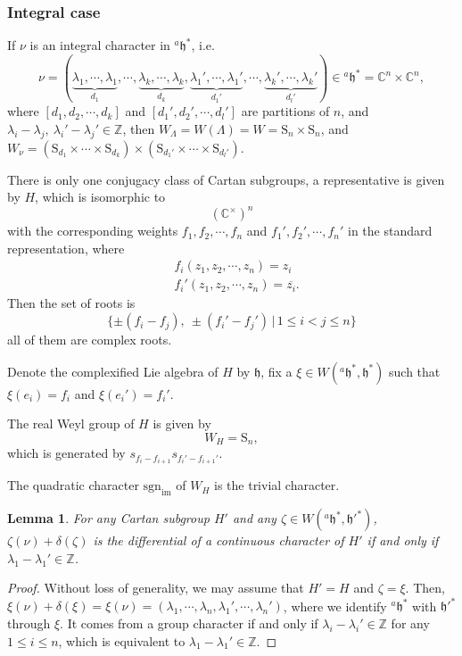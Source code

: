 \documentclass[12pt, a4paper]{amsart}
\numberwithin{equation}{section}
\newtheorem{lem}[thm]{Lemma}
\newcommand{\BC}{{\mathbb {C}}}
\newcommand{\BZ}{{\mathbb {Z}}}
\newcommand{\fh}{\mathfrak{h}}
\newcommand{\sgn}{{\mathrm{sgn}}}
\newcommand{\set}[2]{\{#1\,|\,#2\}}
\renewcommand{\bar}{\overline}
\begin{document}
\subsubsection{Integral case}
If $\nu$ is an integral character in $^{a}\fh^*$, i.e. 
$$\nu =  (\underbrace{\lambda_1, \cdots, \lambda_1}_{d_1}, \cdots, \underbrace{\lambda_k, \cdots, \lambda_k}_{d_k}, \underbrace{\lambda_1', \cdots, \lambda_1'}_{d_1'}, \cdots, \underbrace{\lambda_k', \cdots, \lambda_k'}_{d_{l}'} ) \in {^{a}\fh^*} = \BC^n \times \BC^n,$$ 
where $[d_1,d_2,\cdots,d_k]$ and $[d_1',d_2',\cdots,d_l']$ are partitions of $n$, and $\lambda_i - \lambda_j, \ \lambda_i' - \lambda_j' \in \BZ$, then $W_{\Lambda} =W(\Lambda) = W = \mathrm{S}_n \times \mathrm{S}_n$, and $W_\nu = (\mathrm{S}_{d_1} \times \cdots \times \mathrm{S}_{d_k}) \times (\mathrm{S}_{d_1'} \times \cdots \times \mathrm{S}_{d_l'})$. 

There is only one conjugacy class of Cartan subgroups, a representative is given by $H$, which is isomorphic to
$$(\BC^\times)^n$$
with the corresponding weights $f_1,f_2,\cdots,f_n$ and $f_1',f_2',\cdots,f_n'$ in the standard representation, where
\begin{align}
    & f_i(z_1,z_2,\cdots,z_n) = z_i\\
    & f_i'(z_1,z_2,\cdots,z_n) = \bar{z_i}.
\end{align}
Then the set of roots is 
$$\set{\pm(f_i - f_j), \ \pm(f_i'-f_j')}{1\leq i< j \leq n}$$
all of them are complex roots.

Denote the complexified Lie algebra of $H$ by $\fh$, fix a $\xi \in W({^{a}\fh^*},\fh^*)$ such that $\xi(e_i) = f_i$ and $\xi(e_i') = f_i'$.

The real Weyl group of $H$ is given by
$$W_H = \mathrm{S}_n,$$
which is generated by $s_{f_i-f_{i+1}}s_{f_i'-f_{i+1}'}$. 

The quadratic character $\sgn_{\mathrm{im}}$ of $W_{H}$ is the trivial character.

\begin{lem}
    For any Cartan subgroup $H'$ and any $\zeta \in W({^{a}\fh^*,\fh'^*})$, $\zeta(\nu) + \delta(\zeta)$ is the differential of a continuous character of $H'$ if and only if $\lambda_1 - \lambda_1' \in \BZ$.
\end{lem}

\begin{proof}
    Without loss of generality, we may assume that $H' = H$ and $\zeta = \xi$. Then, $\xi(\nu) + \delta(\xi) = \xi(\nu) = (\lambda_1,\cdots,\lambda_n,\lambda_1',\cdots,\lambda_n')$, where we identify ${^{a}\fh^*}$ with $\fh'^*$ through $\xi$. It comes from a group character if and only if $\lambda_i - \lambda_i' \in \BZ$ for any $1 \leq i \leq n$, which is equivalent to $\lambda_1 - \lambda_1' \in \BZ$.
\end{proof}
\end{document}
